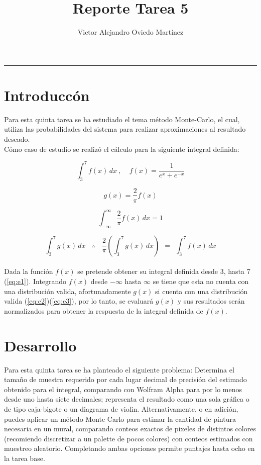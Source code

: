 \documentclass{article}
\title{Reporte Tarea 5}
\author{Victor Alejandro Oviedo Martínez}
\begin{document}
\maketitle
\hrule

\section{Introduccón}\label{intro}
Para esta quinta tarea\citep{DRA.P5} se ha estudiado el tema método Monte-Carlo, el cual, utiliza las probabilidades del sistema para realizar aproximaciones al  resultado deseado.\\

Cómo caso de estudio se realizó el cálculo para la siguiente integral definida:   

\begin{equation}
\label{eq:e1}
\int_{3}^{7}  \! f(x) \, dx  ~ , ~~~~~ f(x)= \frac{1}{e^x + e^{-x}} 
\end{equation}

\begin{equation}
\label{eq:e2}
 g(x) = \frac{2}{\pi}  f(x) 
 \end{equation}

\begin{equation}
\label{eq:e3}
\int_{-\infty}^{\infty}  \! \frac{2}{\pi}  f(x) \, dx = 1
\end{equation}

\begin{equation}
\label{eq:e4}
 \int_{3}^{7}  \! g(x) \, dx  ~~~~  \therefore ~~~~   \frac{2}{\pi} \left(\int_{3}^{7}  \! g(x) \, dx  \right) ~~ = ~~ \int_{3}^{7}  \! f(x) \, dx
\end{equation}
\\

Dada la función $f(x)$ se pretende obtener su integral definida desde 3, hasta 7 (\ref{eq:e1}). Integrando $f(x)$ desde $-\infty$ hasta $\infty$  se tiene que esta no cuenta con una distribución valida, afortunadamente $g(x)$ si cuenta con una distribución valida (\ref{eq:e2})(\ref{eq:e3}), por lo tanto, se evaluará $g(x)$ y sus resultados serán normalizados para obtener la respuesta de la integral definida de $f(x)$.\\




 
 


\section{Desarrollo}
Para esta quinta tarea se ha planteado el siguiente problema: Determina el tamaño de muestra requerido por cada lugar decimal de precisión del estimado obtenido para el integral, comparando con Wolfram Alpha para por lo menos desde uno hasta siete decimales; representa el resultado como una sola gráfica o de tipo caja-bigote o un diagrama de violin. Alternativamente, o en adición, puedes aplicar un método Monte Carlo para estimar la cantidad de pintura necesaria en un mural, comparando conteos exactos de pixeles de distintos colores (recomiendo discretizar a un palette de pocos colores) con conteos estimados con muestreo aleatorio. Completando ambas opciones permite puntajes hasta ocho en la tarea base.
\end{document}
